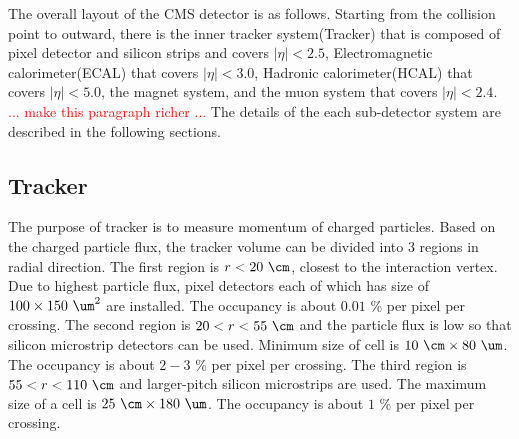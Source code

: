 The overall layout of the CMS detector is as follows. 
Starting from the collision point to outward, there is the inner tracker system(Tracker) 
that is composed of pixel detector and silicon strips and covers $|\eta|<2.5$, 
Electromagnetic calorimeter(ECAL) that covers  $|\eta|<3.0$, 
Hadronic calorimeter(HCAL) that covers  $|\eta|<5.0$, the magnet system, 
and the muon system that covers  $|\eta|<2.4$. 
\textcolor{red}{... make this paragraph richer ... } 
The details of the each sub-detector system are described in the following sections. 





\subsection{Tracker}

The purpose of tracker is to measure momentum of charged particles. 
Based on the charged particle flux, the tracker volume can be divided 
into 3 regions in radial direction. The first region is $r<20~\cm$, closest 
to the interaction vertex. Due to highest particle flux, pixel detectors 
each of which has size of $100 \times 150~\um^2$ are installed. 
The occupancy is about $0.01$ \% per pixel per crossing. 
The second region is $20<r<55~\cm$ and the particle flux is low so that silicon 
microstrip detectors can be used. Minimum size of cell is $10~\cm \times 80~\um$.
The occupancy is about $2-3$ \% per pixel per crossing. 
The third region is $55<r<110~\cm$ and larger-pitch silicon microstrips
are used. The maximum size of a cell is $25~\cm \times 180~\um$.
The occupancy is about $1$ \% per pixel per crossing. 

